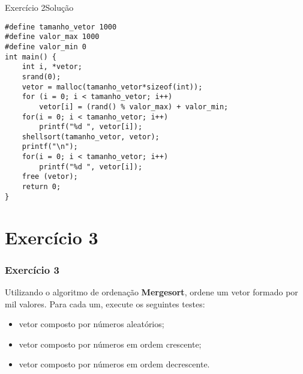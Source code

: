 \documentclass[aspectratio=169]{beamer}
\begin{document}

\begin{frame}[fragile]{Exercício 2}{Solução}
\begin{lstlisting}[style=CStyle]
#define tamanho_vetor 1000
#define valor_max 1000
#define valor_min 0
int main() {
    int i, *vetor;
    srand(0);
    vetor = malloc(tamanho_vetor*sizeof(int));
    for (i = 0; i < tamanho_vetor; i++) 
        vetor[i] = (rand() % valor_max) + valor_min;
    for(i = 0; i < tamanho_vetor; i++)
        printf("%d ", vetor[i]);
    shellsort(tamanho_vetor, vetor);
    printf("\n");
    for(i = 0; i < tamanho_vetor; i++)
        printf("%d ", vetor[i]);
    free (vetor);
    return 0;
}
\end{lstlisting}  
\end{frame}


\section{Exercício 3}

\begin{frame}
\frametitle{Exercício 3}
Utilizando o algoritmo de ordenação {\bf Mergesort}, ordene um vetor formado por mil valores. Para cada um, execute os seguintes testes:
\begin{itemize}
 \item vetor composto por números aleatórios;
 \item vetor composto por números em ordem crescente;
 \item vetor composto por números em ordem decrescente.
\end{itemize} 
\end{frame}

\end{document}
